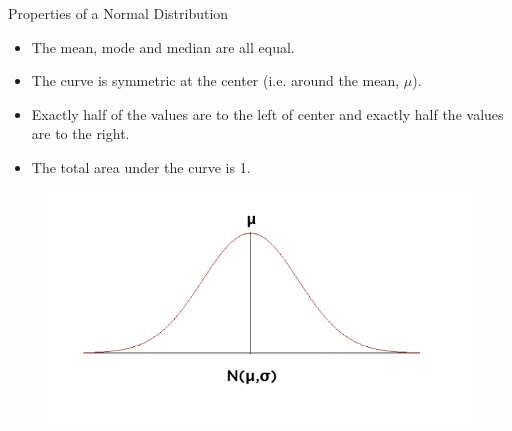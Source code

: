 \documentclass[10pt,dvipsnames, aspectratio=169]{beamer}
\begin{document}
\begin{frame}[t]{Properties of a Normal Distribution}
	\begin{itemize}
		\item The mean, mode and median are all equal.
		\item The curve is symmetric at the center (i.e. around the mean, 
		$\mu$).
		\item Exactly half of the values are to the left of center and exactly 
		half the values are to the right.
		\item The total area under the curve is 1.
	\end{itemize}
	
	\begin{figure} [ht]
		\centering
		\includegraphics[trim={0 1cm 0 0}, clip, scale=0.4]{eda/nd3.png}
	\end{figure}
\end{frame}
\end{document}
